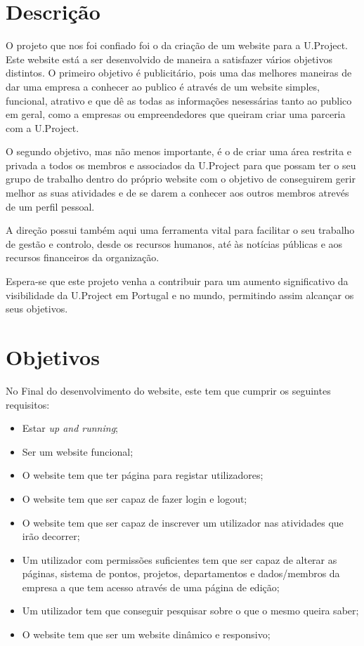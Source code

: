 \documentclass[11pt]{report}
\begin{document}
\section{Descrição}
O projeto que nos foi confiado foi o da criação de um website para a U.Project.
Este website está a ser desenvolvido de maneira a satisfazer vários objetivos distintos.
O primeiro objetivo é publicitário, pois uma das melhores maneiras de dar uma empresa a conhecer ao publico é através de um website simples, funcional, atrativo e que dê as todas as informações nesessárias tanto ao publico em geral, como a empresas ou empreendedores que queiram criar uma parceria com a U.Project.


O segundo objetivo, mas não menos importante, é o de criar uma área restrita e privada a todos os membros e associados da U.Project para que possam ter o seu grupo de trabalho dentro do próprio website com o objetivo de conseguirem gerir melhor as suas atividades e de se darem a conhecer aos outros membros atrevés de um perfil pessoal.

A direção possui também aqui uma ferramenta vital para facilitar o seu trabalho de gestão e controlo, desde os recursos humanos, até às notícias públicas e aos recursos financeiros da organização.

Espera-se que este projeto venha a contribuir para um aumento significativo da visibilidade da U.Project em Portugal e no mundo, permitindo assim alcançar os seus objetivos.
\section{Objetivos}
No Final do desenvolvimento do website, este tem que cumprir os seguintes requisitos:
\begin{itemize}
\item Estar \textit{up and running};
\item Ser um website funcional;
\item O website tem que ter página para registar utilizadores;
\item O website tem que ser capaz de fazer login e logout;
\item O website tem que ser capaz de inscrever um utilizador nas atividades que irão decorrer;
\item Um utilizador com permissões suficientes tem que ser capaz de alterar as páginas, sistema de pontos, projetos, departamentos e dados/membros da empresa a que tem acesso através de uma página de edição;
\item Um utilizador tem que conseguir pesquisar sobre o que o mesmo queira saber;
\item O website tem que ser um website dinâmico e responsivo;
\end{itemize}
\end{document}
